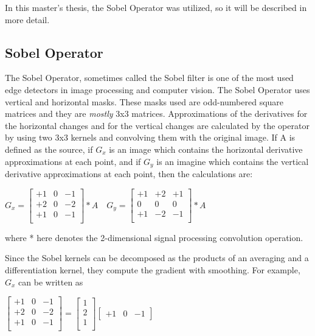 In this master's thesis, the Sobel Operator was utilized, so it will be described in more detail.

%
\subsection{Sobel Operator}\label{sec:Sobel Operator}

The Sobel Operator, sometimes called the Sobel filter is one of the most used edge detectors in image processing and computer vision. The Sobel Operator uses vertical and horizontal masks. These masks used are odd-numbered square matrices and they are \emph{\color{blue}mostly} 3x3 matrices. Approximations of the derivatives for the horizontal changes and for the vertical changes are calculated by the operator by using two 3x3 kernels and convolving them with the original image. If A is defined as the source, if $G_{x}$ is an image which contains the horizontal derivative approximations at each point, and if $G_{y}$ is an imagine which contains the vertical derivative approximations at each point, then the calculations are:

\begin{center}

$  G_{x} = 
  \begin{bmatrix}
	+1 & 0 & -1 \\
	+2 & 0 & -2 \\
	+1 & 0 & -1 \\
   \end{bmatrix} * A  \quad
  G_{y} = 
  \begin{bmatrix}
	+1 & +2 & +1 \\
	0 & 0 & 0 \\
	+1 & -2 & -1 \\
  \end{bmatrix} * A		$

\end{center}

where * here denotes the 2-dimensional signal processing convolution operation.

Since the Sobel kernels can be decomposed as the products of an averaging and a differentiation kernel, they compute the gradient with smoothing. For example, \textbf{$G_{x}$}  can be written as

\begin{center}
$  \begin{bmatrix}
	+1 & 0 & -1 \\
	+2 & 0 & -2 \\
	+1 & 0 & -1 \\
   \end{bmatrix} =  \begin{bmatrix}
	1 \\
	2 \\
	1 \\
  \end{bmatrix} \begin{bmatrix}
	+1 & 0 & -1
  \end{bmatrix}
$
\end{center}


